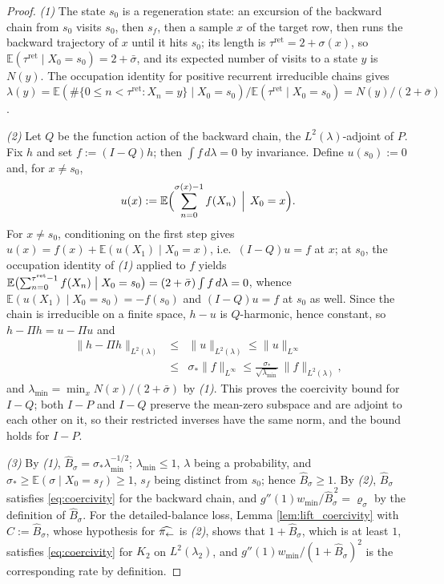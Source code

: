 \begin{proof}
\emph{(1)} The state $s_0$ is a regeneration state: an excursion of the backward chain from $s_0$ visits $s_0$, then $s_f$, then a sample $x$ of the target row, then runs the backward trajectory of $x$ until it hits $s_0$; its length is $\tau^{\mathrm{ret}}=2+\sigma(x)$, so $\mathbb E(\tau^{\mathrm{ret}}\mid X_0=s_0)=2+\bar\sigma$, and its expected number of visits to a state $y$ is $N(y)$. The occupation identity for positive recurrent irreducible chains \cite{levin2017markov} gives $\lambda(y)=\mathbb E(\#\{0\leq n<\tau^{\mathrm{ret}}:X_n=y\}\mid X_0=s_0)/\mathbb E(\tau^{\mathrm{ret}}\mid X_0=s_0)=N(y)/(2+\bar\sigma)$.

\emph{(2)} Let $Q$ be the function action of the backward chain, the $L^2(\lambda)$-adjoint of $P$. Fix $h$ and set $f:=(I-Q)h$; then $\int f\,d\lambda=0$ by invariance. Define $u(s_0):=0$ and, for $x\neq s_0$,
\begin{equation*}
    u(x):=\mathbb E\Bigl(\sum_{n=0}^{\sigma(x)-1}f(X_n)\,\Bigm|\,X_0=x\Bigr).
\end{equation*}
For $x\neq s_0$, conditioning on the first step gives $u(x)=f(x)+\mathbb E(u(X_1)\mid X_0=x)$, i.e.\ $(I-Q)u=f$ at $x$; at $s_0$, the occupation identity of \emph{(1)} applied to $f$ yields $\mathbb E\bigl(\sum_{n=0}^{\tau^{\mathrm{ret}}-1}f(X_n)\bigm| X_0=s_0\bigr)=(2+\bar\sigma)\int f\,d\lambda=0$, whence $\mathbb E(u(X_1)\mid X_0=s_0)=-f(s_0)$ and $(I-Q)u=f$ at $s_0$ as well. Since the chain is irreducible on a finite space, $h-u$ is $Q$-harmonic, hence constant, so $h-\Pi h=u-\Pi u$ and
\begin{eqnarray*}
    \|h-\Pi h\|_{L^2(\lambda)}&\leq&\|u\|_{L^2(\lambda)}\leq\|u\|_{L^\infty}\\
    &\leq&\sigma_*\|f\|_{L^\infty}\leq\frac{\sigma_*}{\sqrt{\lambda_{\min}}}\,\|f\|_{L^2(\lambda)},
\end{eqnarray*}
and $\lambda_{\min}=\min_xN(x)/(2+\bar\sigma)$ by \emph{(1)}. This proves the coercivity bound for $I-Q$; both $I-P$ and $I-Q$ preserve the mean-zero subspace and are adjoint to each other on it, so their restricted inverses have the same norm, and the bound holds for $I-P$.

\emph{(3)} By \emph{(1)}, $\widehat B_\sigma=\sigma_*\lambda_{\min}^{-1/2}$; $\lambda_{\min}\leq1$, $\lambda$ being a probability, and $\sigma_*\geq\mathbb E(\sigma\mid X_0=s_f)\geq1$, $s_f$ being distinct from $s_0$; hence $\widehat B_\sigma\geq1$. By \emph{(2)}, $\widehat B_\sigma$ satisfies \eqref{eq:coercivity} for the backward chain, and $g''(1)w_{\min}/\widehat B_\sigma^{\,2}=\varrho_\sigma$ by the definition of $\widehat B_\sigma$. For the detailed-balance loss, Lemma \ref{lem:lift_coercivity} with $C:=\widehat B_\sigma$, whose hypothesis for $\widehat{\pi_{\leftarrow}}$ is \emph{(2)}, shows that $1+\widehat B_\sigma$, which is at least $1$, satisfies \eqref{eq:coercivity} for $K_2$ on $L^2(\lambda_2)$, and $g''(1)w_{\min}/(1+\widehat B_\sigma)^2$ is the corresponding rate by definition.


\end{proof}
